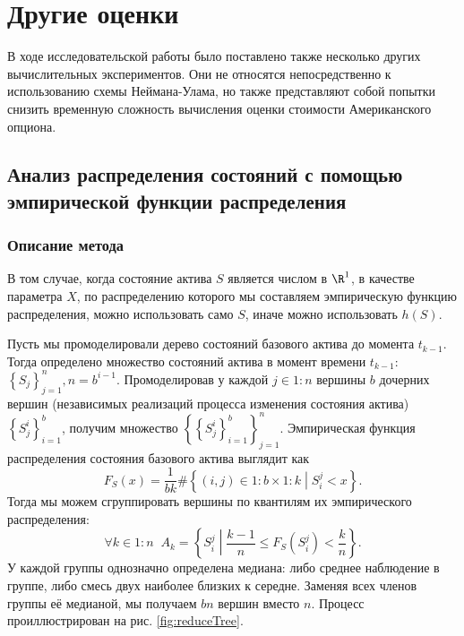 \chapter{Другие оценки}

В ходе исследовательской работы было поставлено также несколько других вычислительных экспериментов. Они не относятся непосредственно к использованию схемы Неймана-Улама, но также представляют собой попытки снизить временную сложность вычисления оценки стоимости Американского опциона.

\section{Анализ распределения состояний с помощью эмпирической функции распределения}
	    \subsection{Описание метода}
        \par В том случае, когда состояние актива $S$ является числом в $\R ^1$, в качестве параметра $X$, по распределению которого мы составляем эмпирическую функцию распределения, можно использовать  само $S$, иначе можно использовать $h(S)$.
        \par Пусть мы промоделировали дерево состояний базового актива до момента $t_{k-1}$. Тогда определено множество состояний актива в момент времени $t_{k-1}$: $\left\lbrace S_j \right\rbrace_{j=1}^n, n=b^{i-1}$. Промоделировав у каждой $j\in 1:n$ вершины $b$ дочерних вершин (независимых реализаций процесса изменения состояния актива) $\left\lbrace S_j^i\right\rbrace_{i=1}^b$, получим множество $\left\lbrace\left\lbrace S_j^i \right\rbrace_{i=1}^b\right\rbrace_{j=1}^n$. Эмпирическая функция распределения состояния базового актива выглядит как
        $$F_{S}(x) = \frac{1}{bk}\#\left\lbrace (i, j) \in 1:b \times 1:k \middle\vert S_i^j < x \right\rbrace.$$
        Тогда мы можем сгруппировать вершины по квантилям их эмпирического распределения:
        $$\forall k\in 1:n \;\; A_k = \left\lbrace S_i^j \middle\vert \frac{k-1}{n} \leq F_{S}(S_i^j) < \frac{k}{n}\right\rbrace.$$
        У каждой группы однозначно определена медиана: либо среднее наблюдение в группе, либо смесь двух наиболее близких к середне. Заменяя всех членов группы её медианой, мы получаем $bn$ вершин вместо $n$. Процесс проиллюстрирован на рис. \ref{fig:reduceTree}.
